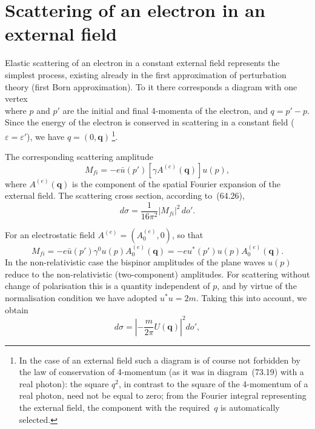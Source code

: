 \section{Scattering of an electron in an external field}

Elastic scattering of an electron in a constant external field represents the simplest process, existing already in the first approximation of perturbation theory (first Born approximation). To it there corresponds a diagram with one vertex
\begin{equation}
\tag{80.1}
\end{equation}
where $p$ and $p'$ are the initial and final 4-momenta of the electron, and $q = p' - p$. Since the energy of the electron is conserved in scattering in a constant field ($\varepsilon = \varepsilon'$), we have $q = (0, \mathbf{q})$\,\footnote{In the case of an external field such a diagram is of course not forbidden by the law of conservation of 4-momentum (as it was in diagram~(73.19) with a real photon): the square $q^2$, in contrast to the square of the 4-momentum of a real photon, need not be equal to zero; from the Fourier integral representing the external field, the component with the required~$q$ is automatically selected.}.

The corresponding scattering amplitude
\begin{equation}
M_{fi} = -e\bar{u}(p')[\gamma A^{(e)}(\mathbf{q})]u(p),
\tag{80.2}
\end{equation}
where $A^{(e)}(\mathbf{q})$ is the component of the spatial Fourier expansion of the external field. The scattering cross section, according to~(64.26),
\begin{equation}
d\sigma = \frac{1}{16\pi^2}|M_{fi}|^2\,do'.
\tag{80.3}
\end{equation}

For an electrostatic field $A^{(e)} = (A_0^{(e)}, 0)$, so that
\begin{equation}
M_{fi} = -e\bar{u}(p')\gamma^0 u(p)A_0^{(e)}(\mathbf{q}) = -eu^*(p')u(p)A_0^{(e)}(\mathbf{q}).
\tag{80.4}
\end{equation}
In the non-relativistic case the bispinor amplitudes of the plane waves $u(p)$ reduce to the non-relativistic (two-component) amplitudes. For scattering without change of polarisation this is a quantity independent of $p$, and by virtue of the normalisation condition we have adopted $u^*u = 2m$. Taking this into account, we obtain
\[
d\sigma = \left|-\frac{m}{2\pi}U(\mathbf{q})\right|^2 do',
\]

